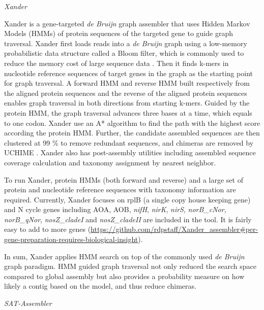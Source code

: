 \documentclass[]{msu-thesis}
\begin{document}
\textit{Xander}

Xander is a gene-targeted \textit{de Bruijn} graph assembler that uses
Hidden Markov Models
(HMMs) of protein sequences of the targeted gene to guide graph traversal.
Xander first
loads reads into a \textit{de Bruijn} graph using a low-memory probabilistic data
structure called a Bloom filter, which is commonly used to reduce the
memory cost of large sequence data \cite{pell_scaling_2012}. Then it
finds k-mers in nucleotide reference sequences of target genes in the
graph as the starting point for graph traversal. A forward HMM and
reverse HMM built respectively from the aligned protein sequences and the reverse
of the aligned protein sequences enables graph
traversal in both directions from starting k-mers. Guided by the
protein HMM, the graph traversal advances three bases at a
time, which equals to one codon. Xander use an A* algorithm to find the
path with the highest score according the protein HMM. Further, the
candidate assembled sequences are then clustered at 99 \% to remove
redundant sequences, and chimeras are removed by UCHIME
\cite{edgar_uchime_2011}. Xander also has post-assembly utilities
including assembled sequence coverage calculation and taxonomy assignment
by nearest neighbor.

To run Xander, protein HMMs (both forward and reverse) and a large set
of protein and nucleotide reference sequences with taxonomy
information are required. Currently, Xander focuses on
rplB (a single copy
house keeping gene) and N cycle genes including AOA, AOB,
\textit{nifH}, \textit{nirK}, \textit{nirS}, \textit{norB\_cNor},
\textit{norB\_qNor}, \textit{nosZ\_cladeI} and \textit{nosZ\_cladeII}
are included in the tool. It is fairly easy to add to more genes
(\url{https://github.com/rdpstaff/Xander\_assembler\#per-gene-preparation-requires-biological-insight}).

In sum, Xander applies HMM search on top of the commonly used
\textit{de Bruijn} graph paradigm. HMM guided graph traversal not only
reduced the search space compared to global assembly but also provides
a probability measure on how likely a contig based on the model, and
thus reduce chimeras.

\textit{SAT-Assembler}
\end{document}
